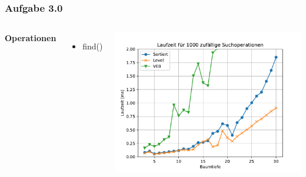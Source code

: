 \documentclass[aspectratio=169]{beamer}
\begin{document}
\begin{frame}
\frametitle{Aufgabe 3.0}
\begin{columns}[c] %
	
	\textbf{Operationen}
	\begin{itemize}
		\item find()
	\end{itemize}
	
	\includegraphics[scale=.6]{Figure_4.pdf}
	
	
\end{columns}
\end{frame}



							
\end{document}
